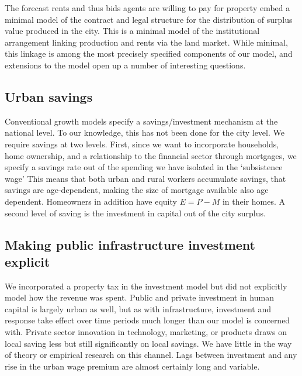The forecast rents and thus bids agents are willing to pay for property embed a minimal model of the contract and legal structure for the distribution of surplus value produced in the city. This is a minimal model of the institutional arrangement linking production and rents via the land market. While minimal, this linkage is among the most precisely specified components of our model, and extensions to the model open up a number of interesting questions. 

\subsection{Urban savings}

Conventional growth models specify a savings/investment mechanism at the national level. To our knowledge, this has not been done for the city level. We require savings at two levels. First, since we want to incorporate households, home ownership, and a relationship to the financial sector through mortgages, we specify a savings rate out of the spending we have isolated in the `subsistence wage' This means that both urban and rural workers accumulate savings, that savings are age-dependent, making the size of mortgage available also age dependent. 
Homeowners in addition have equity $E=P-M$ in their homes. %
{A second level of saving is the investment in capital out of the city surplus.} %

\subsection{Making public infrastructure investment explicit}
We incorporated a property tax in the investment model but did not explicitly model how the revenue was spent. Public and private investment in human capital is largely urban as well, but as with infrastructure, investment and response take effect over time periods much longer than our model is concerned with. Private sector innovation in technology, marketing, or products draws on local saving less but still significantly on local savings. We have little in the way of theory or empirical research on this channel. Lags between investment and any rise in the urban wage premium are almost certainly long and variable. 

